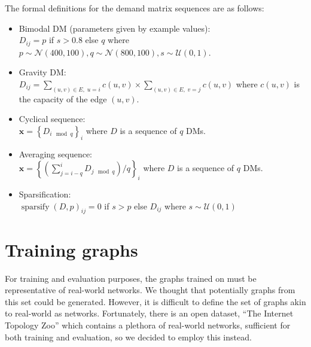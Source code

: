 The formal definitions for the demand matrix sequences are as follows:
\begin{itemize}
  \item Bimodal DM (parameters given by example values):\\
    $D_{ij} = p$ if $s > 0.8$ else $q$ where $p \sim \mathcal{N}(400, 100), q \sim \mathcal{N}(800, 100), s \sim \mathcal{U}(0,1)$.
  \item Gravity DM:\\
    $D_{ij} = \sum_{(u, v) \in E,\; u = i }{c(u,v)} \times \sum_{(u, v) \in E,\; v = j }{c(u, v)}$ where $c(u,v)$ is the capacity of the edge $(u,v)$.
  \item Cyclical sequence:\\
    $\bm{x} = \left\{ D_{i \mod q} \right\}_{i}$ where $D$ is a sequence of $q$ DMs.
  \item Averaging sequence:\\
    $\bm{x} = \left\{\left(\sum_{j=i-q}^{i}{D_{j \mod q}}\right) / q \right\}_{i}$ where $D$ is a sequence of $q$ DMs.
  \item Sparsification:\\
    $\operatorname{sparsify}(D, p)_{ij} = 0$ if $s > p$ else $D_{ij}$ where $s \sim \mathcal{U}(0,1)$
\end{itemize}

\section{Training graphs}
For training and evaluation purposes, the graphs trained on must be representative of real-world networks. We thought that potentially graphs from this set could be generated. However, it is difficult to define the set of graphs akin to real-world \ac{as} networks. Fortunately, there is an open dataset, ``The Internet Topology Zoo''\cite{6027859} which contains a plethora of real-world networks, sufficient for both training and evaluation, so we decided to employ this instead.


